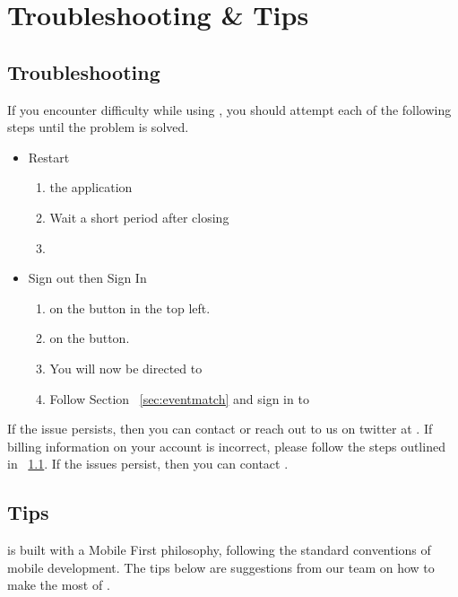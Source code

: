 \section{Troubleshooting \& Tips}
\label{sec:troubleshootandtips}

\subsection{Troubleshooting}
\label{sec:troubleshoot}
If you encounter difficulty while using \Friending{}, you should attempt each of the following steps until the problem is solved.

\begin{itemize}
\item Restart \Friending{}
\begin{enumerate}
\item {} the application
\item Wait a short period  after closing
\item {} \Friending{}
\end{enumerate}
\item Sign out then Sign In
\begin{enumerate}
\setNavigationMenuColor
\item {} on the  button in the top left.
\item {} on the  button.
\item You will now be directed to 
\item Follow Section ~\ref{sec:eventmatch} and sign in to \Friending{}
\setDefaultMenuColor
\end{enumerate}
\end{itemize}

If the issue persists, then you can contact  or reach out to us on twitter at . If billing information on your account is incorrect, please follow the steps outlined in ~\ref{sec:troubleshoot}. If the issues persist, then you can contact .

\subsection{Tips}
\label{sec:tips}

\Friending{} is built with a Mobile First philosophy, following the standard conventions of mobile development. The tips below are suggestions from our team on how to make the most of \Friending{}.

